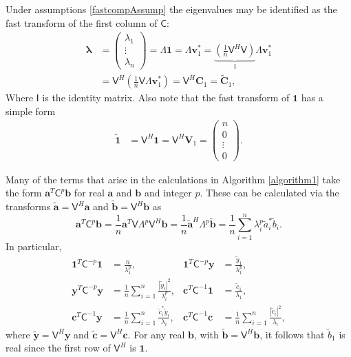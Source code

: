 \documentclass[twocolumn]{svjour3}          %
\newcommand{\bm}[1]{\boldsymbol{#1}}
\newcommand{\vlambda}{{\bm{\lambda}}}
\newcommand{\va}{\bm{a}}
\newcommand{\vb}{\bm{b}}
\newcommand{\vc}{\bm{c}}
\newcommand{\vC}{\bm{C}}
\newcommand{\vv}{\bm{v}}
\newcommand{\vV}{\bm{V}}
\newcommand{\vy}{\bm{y}}
\newcommand{\vone}{\bm{1}}
\newcommand{\mC}{\mathsf{C}}
\newcommand{\mCInv}{{\mathsf{C}^{-1}}}
\newcommand{\mLambda}{\mathsf{\Lambda}}
\newcommand{\mV}{\mathsf{V}}
\def\abs#1{\ensuremath{\left \lvert #1 \right \rvert}}
\begin{document}
Under assumptions \eqref{fastcompAssump} the eigenvalues may be identified as the fast transform of the first column of $\mC$:
\begin{align}
\nonumber
\vlambda 
& = \begin{pmatrix}
\lambda_1 \\ \vdots \\ \lambda_n
\end{pmatrix} = \mLambda \vone = \mLambda \vv_1^* 
= \underbrace{\left( \frac 1n \mV^H  \mV \right) }_{\mathsf{I}} \mLambda \vv_1^* \\
&= \mV^H \left( \frac 1n \mV \mLambda \vv_1^* \right)
= \mV^H \vC_1 =  \widetilde{\vC}_1,
\label{eqn:fast_transform_to_eigvalues}
\end{align}
Where $\mathsf{I}$ is the identity matrix.
Also note that the fast transform of $\vone$ has a simple form
\begin{align*} 
\widetilde{\vone}
& = \mV^H \vone = \mV^H \vV_1 = \begin{pmatrix}n  \\ 0 \\ \vdots \\ 0 \end{pmatrix}.
\label{eqn:fast_transform_one}
\end{align*}

Many of the terms that arise in the calculations in  Algorithm \ref{algorithm1} take the form $\va^T\mC^{p}\vb$ for real $\va$ and $\vb$ and integer $p$.  These can be calculated via the transforms $\widetilde{\va} = \mV^H \va$ and $\widetilde{\vb} = \mV^H \vb$ as 
\begin{equation*}
\va^T\mC^p\vb = \frac 1n \va^T \mV \mLambda^p \mV^H \vb
= \frac 1n \widetilde{\va}^H\mLambda^p \widetilde{\vb}
= \frac 1n \sum_{i=1}^n \lambda_i^p \widetilde{a}_i^* \widetilde{b}_i.
\end{equation*}
In particular,
\begin{align*}
\vone^T\mC^{-p}\vone & = \frac{n}{\lambda_1^p},
&
\vone^T\mC^{-p}\vy &= \frac{\widetilde{y}_1}{\lambda_1^p},
\\
\vy^T\mC^{-p} \vy &= \frac 1n \sum_{i=1}^n \frac{\abs{\widetilde{y}_i}^2}{\lambda_i^p},
&
\vc^T\mCInv \vone &= \frac{\widetilde{c}_1}{\lambda_1},\\
\vc^T\mCInv \vy &= \frac 1n \sum_{i=1}^n \frac{\widetilde{c}_i^* \widetilde{y}_i}{\lambda_i}, & 
\vc^T\mCInv \vc &= \frac 1n \sum_{i=1}^n \frac{\abs{\widetilde{c}_i}^2}{\lambda_i},
\end{align*}
where $\widetilde{\vy} = \mV^H \vy$ and 
$\widetilde{\vc} = \mV^H \vc$.  For any real $\vb$, with $\widetilde{\vb} = \mV^H\vb$, it follows that $\widetilde{b}_1$ is real since the first row of $\mV^H$ is $\vone$.
\end{document}
